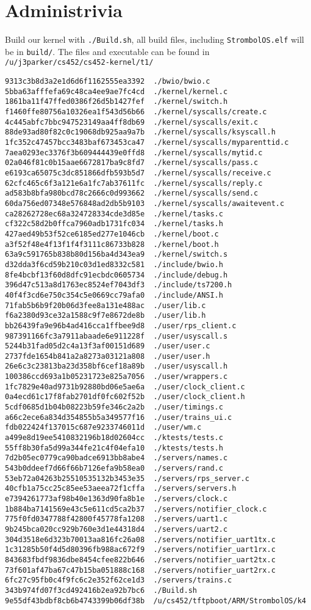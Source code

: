 \documentclass{article}
\begin{document}
\section{Administrivia}
Build our kernel with \texttt{./Build.sh}, all build files, including
\texttt{StrombolOS.elf} will be in \texttt{build/}. The files and executable can
be found in \texttt{/u/j3parker/cs452/cs452-kernel/t1/}
\begin{verbatim}
9313c3b8d3a2e1d6d6f1162555ea3392  ./bwio/bwio.c
5bba63afffefa69c48ca4ee9ae7fc4cd  ./kernel/kernel.c
1861ba11f47ffed0386f26d5b1427fef  ./kernel/switch.h
f1460ffe80756a10326ea1f543d56b66  ./kernel/syscalls/create.c
4c445abfc7bbc947523149aa4ff8db69  ./kernel/syscalls/exit.c
88de93ad80f82c0c19068db925aa9a7b  ./kernel/syscalls/ksyscall.h
1fc352c47457bcc3483baf673453ca47  ./kernel/syscalls/myparenttid.c
7aea0293ec3376f3b609444439e0ffd8  ./kernel/syscalls/mytid.c
02a046f81c0b15aae6672817ba9c8fd7  ./kernel/syscalls/pass.c
e6193ca65075c3dc851866dfb593b5d7  ./kernel/syscalls/receive.c
62cfc465c6f3a121e6a1fc7ab37611fc  ./kernel/syscalls/reply.c
ad583b8bfa980bcd78c2666c0d993662  ./kernel/syscalls/send.c
60da756ed07348e576848ad2db5b9103  ./kernel/syscalls/awaitevent.c
ca28262728ec68a324728334cde3d85e  ./kernel/tasks.c
cf322c58d2b0ffca7960adb1731fc034  ./kernel/tasks.h
427aed49b53f52ce6185ed277e1046cb  ./kernel/boot.c
a3f52f48e4f13f1f4f3111c86733b828  ./kernel/boot.h
63a9c591765b838b80d156ba4d343ea9  ./kernel/switch.s
d32dda3f6cd59b210c03d1ed8332c581  ./include/bwio.h
8fe4bcbf13f60d8dfc91ecbdc0605734  ./include/debug.h
396d47c513a8d1763ec8524ef7043df3  ./include/ts7200.h
40f4f3cd6e750c354c5e0669cc79afa0  ./include/ANSI.h
71fab5b6b9f20b06d3fee8a131e488ac  ./user/lib.c
f6a2380d93ce32a1588c9f7e8672de8b  ./user/lib.h
bb26439fa9e96b4ad416cca1ffbee9d8  ./user/rps_client.c
987391166fc3a7911abaade6e911228f  ./user/usyscall.s
5244b31fad05d2c4a13f3af00151d689  ./user/user.c
2737fde1654b841a2a8273a03121a808  ./user/user.h
26e6c3c23813ba23d358bf6cef18a89b  ./user/usyscall.h
100386ccd693a1b05231723e825a7056  ./user/wrappers.c
1fc7829e40ad9731b92880bd06e5ae6a  ./user/clock_client.c
0a4ecd61c17f8fab2701df0fc602f52b  ./user/clock_client.h
5cdf0685d1b04b08223b59fe346c2a2b  ./user/timings.c
a66c2ece6a834d354855b5a349577f16  ./user/trains_ui.c
fdb022424f137015c687e9233746011d  ./user/wm.c
a499e8d19ee5410832196b18d02604cc  ./ktests/tests.c
55ff8b30fa5d99a344fe21c4f04efa10  ./ktests/tests.h
7d2b05ec0779ca90badce6913bb8abe4  ./servers/names.c
543b0ddeef7d66f66b7126efa9b58ea0  ./servers/rand.c
53eb72a04263b25510535132b3453e35  ./servers/rps_server.c
40cfb1a75cc25c85ee53aeea72f1cffa  ./servers/servers.h
e7394261773af98b40e1363d90fa8b1e  ./servers/clock.c
1b884ba7141569e43c5e611cd5ca2b37  ./servers/notifier_clock.c
775f0fd0347788f42800f45778fa1208  ./servers/uart1.c
9b245bca020cc929b760e3d1e44318d4  ./servers/uart2.c
304d3518e6d323b70013aa816fc26a08  ./servers/notifier_uart1tx.c
1c31285b50f4d5d80396fb988ac672f9  ./servers/notifier_uart1rx.c
843683fbdf9836dbe8454cfee822b646  ./servers/notifier_uart2tx.c
73f601af47ba67c47b15ba051888c168  ./servers/notifier_uart2rx.c
6fc27c95fb0c4f9fc6c2e352f62ce1d3  ./servers/trains.c
343b974fd07f3cd492416b2ea92b7bc6  ./Build.sh
9e55df43bdbf8cb6b4743399b06df38b  /u/cs452/tftpboot/ARM/StrombolOS/k4
\end{verbatim}
\end{document}

